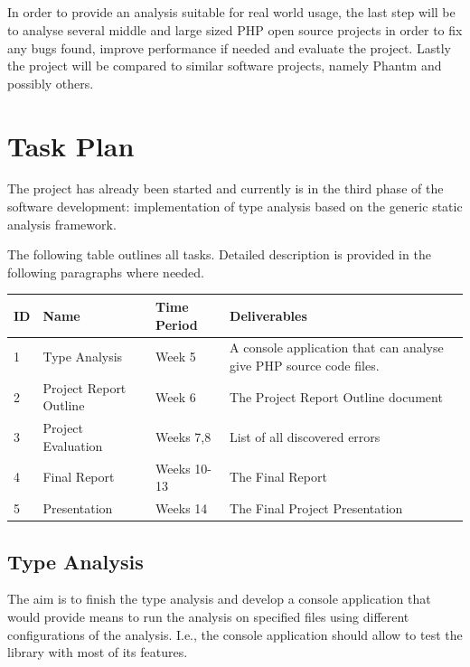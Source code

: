 \paragraph*{}
In order to provide an analysis suitable for real world usage, 
the last step will be to analyse several middle and large sized 
PHP open source projects in order to fix any bugs found, 
improve performance if needed and evaluate the project. 
Lastly the project will be compared to similar software 
projects, namely Phantm \cite{kneuss2010using} and possibly others.


\chapter{Task Plan}
The project has already been started and currently is in the 
third phase of the software development: implementation of type 
analysis based on the generic static analysis framework. 

The following table outlines all tasks. Detailed description 
is provided in the following paragraphs where needed.

\begin{center}
    \begin{tabular}{ | l | l | l | p{7cm} |}
    \hline
    ID & Name & Time Period & Deliverables\\ \hline
    
    1 & Type Analysis & Week 5 & 
        A console application that can analyse give PHP source code files.
    \\ \hline
        
    2 & Project Report Outline & Week 6 & 
        The Project Report Outline document \\ \hline
        
    3 & Project Evaluation & Weeks 7,8 &
        List of all discovered errors \\ \hline
        
    4 & Final Report & Weeks 10-13 &
        The Final Report \\ \hline        
        
    5 & Presentation & Weeks 14 &
        The Final Project Presentation \\ \hline                

    \end{tabular}
\end{center}

\section{Type Analysis}
The aim is to finish the type analysis and develop a 
console application that would provide means to run 
the analysis on specified files using different 
configurations of the analysis. I.e., 
the console application should allow to test the 
library with most of its features.

